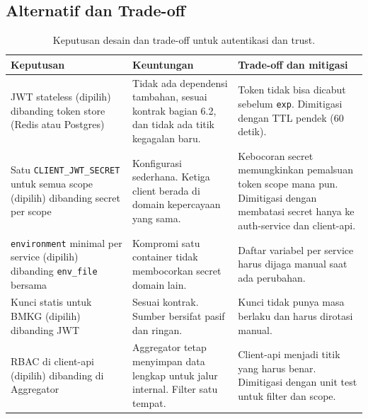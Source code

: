 \subsection{Alternatif dan Trade-off}
\begin{table}[H]
  \centering
  \small
  \begin{tabularx}{\textwidth}{p{3.2cm}XX}
    \toprule
    Keputusan & Keuntungan & Trade-off dan mitigasi \\
    \midrule
    JWT stateless (dipilih) dibanding token store (Redis atau Postgres) &
    Tidak ada dependensi tambahan, sesuai kontrak bagian 6.2, dan tidak ada titik kegagalan baru. &
    Token tidak bisa dicabut sebelum \texttt{exp}. Dimitigasi dengan TTL pendek (60 detik). \\
    \addlinespace
    Satu \texttt{CLIENT\_JWT\_SECRET} untuk semua scope (dipilih) dibanding secret per scope &
    Konfigurasi sederhana. Ketiga client berada di domain kepercayaan yang sama. &
    Kebocoran secret memungkinkan pemalsuan token scope mana pun. Dimitigasi dengan membatasi secret hanya ke auth-service dan client-api. \\
    \addlinespace
    \texttt{environment} minimal per service (dipilih) dibanding \texttt{env\_file} bersama &
    Kompromi satu container tidak membocorkan secret domain lain. &
    Daftar variabel per service harus dijaga manual saat ada perubahan. \\
    \addlinespace
    Kunci statis untuk BMKG (dipilih) dibanding JWT &
    Sesuai kontrak. Sumber bersifat pasif dan ringan. &
    Kunci tidak punya masa berlaku dan harus dirotasi manual. \\
    \addlinespace
    RBAC di client-api (dipilih) dibanding di Aggregator &
    Aggregator tetap menyimpan data lengkap untuk jalur internal. Filter satu tempat. &
    Client-api menjadi titik yang harus benar. Dimitigasi dengan unit test untuk filter dan scope. \\
    \bottomrule
  \end{tabularx}
  \caption{Keputusan desain dan trade-off untuk autentikasi dan trust.}
  \label{tab:p3-tradeoff}
\end{table}

